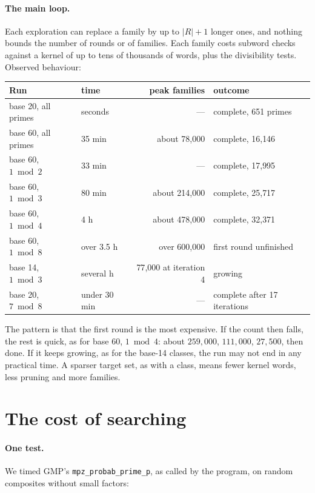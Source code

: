 \documentclass[11pt]{article}
\theoremstyle{remark}
\newcommand{\code}[1]{\texttt{#1}}
\begin{document}
\paragraph{The main loop.} Each exploration can replace a family by up to $|R|+1$ longer ones, and nothing bounds the number of rounds or of families. Each family costs subword checks against a kernel of up to tens of thousands of words, plus the divisibility tests. Observed behaviour:

\begin{center}\small
\begin{tabular}{@{}llrl@{}}
\toprule
Run & time & peak families & outcome\\
\midrule
base 20, all primes & seconds & --- & complete, 651 primes\\
base 60, all primes & 35 min & about 78{,}000 & complete, 16{,}146\\
base 60, $1 \bmod 2$ & 33 min & --- & complete, 17{,}995\\
base 60, $1 \bmod 3$ & 80 min & about 214{,}000 & complete, 25{,}717\\
base 60, $1 \bmod 4$ & 4 h & about 478{,}000 & complete, 32{,}371\\
base 60, $1 \bmod 8$ & over 3.5 h & over 600{,}000 & first round unfinished\\
base 14, $1 \bmod 3$ & several h & 77{,}000 at iteration 4 & growing\\
base 20, $7 \bmod 8$ & under 30 min & --- & complete after 17 iterations\\
\bottomrule
\end{tabular}
\end{center}

The pattern is that the first round is the most expensive. If the count then falls, the rest is quick, as for base 60, $1 \bmod 4$: about $259{,}000$, $111{,}000$, $27{,}500$, then done. If it keeps growing, as for the base-14 classes, the run may not end in any practical time. A sparser target set, as with a class, means fewer kernel words, less pruning and more families.

\section{The cost of searching}

\paragraph{One test.} We timed GMP's \code{mpz\_probab\_prime\_p}, as called by the program, on random composites without small factors:
\end{document}
